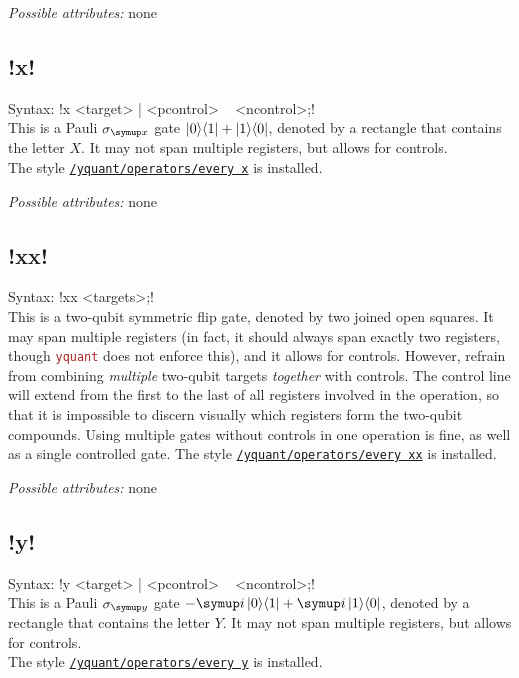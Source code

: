 \documentclass{scrartcl}
\def\pkg#1{\textcolor{brown}{\texttt{#1}}}
\def\style#1{\hyperref[style:#1]{\texttt{#1}}}
\def\Yquant{\pkg{yquant}}
\def\ii{{\symup i}}
\def\ketbra#1#2{\ket{#1}\!\bra{#2}}
\begin{document}
         \emph{Possible attributes:} none
      
      \subsection{\texorpdfstring{\yquant!x!}{x}}\label{gate:x}
         Syntax: \yquant!x <target> | <pcontrol> ~ <ncontrol>;! \\
         This is a Pauli $\sigma_{\symup x}$ gate $\ketbra01 + \ketbra10$, denoted by a rectangle that contains the letter $X$.
         It may not span multiple registers, but allows for controls. \\
         The style \style{/yquant/operators/every x} is installed.
         
         \emph{Possible attributes:} none
         
      \subsection{\texorpdfstring{\yquant!xx!}{xx}}\label{gate:xx}
         Syntax: \yquant!xx <targets>;! \\
         This is a two\hyp qubit symmetric flip gate, denoted by two joined open squares.
         It may span multiple registers (in fact, it should always span exactly two registers, though \Yquant{} does not enforce this), and it allows for controls.
         However, refrain from combining \emph{multiple} two\hyp qubit targets \emph{together} with controls.
         The control line will extend from the first to the last of all registers involved in the operation, so that it is impossible to discern visually which registers form the two\hyp qubit compounds.
         Using multiple gates without controls in one operation is fine, as well as a single controlled gate.
         The style \style{/yquant/operators/every xx} is installed.
         
         \emph{Possible attributes:} none
      
      \subsection{\texorpdfstring{\yquant!y!}{y}}\label{gate:y}
         Syntax: \yquant!y <target> | <pcontrol> ~ <ncontrol>;! \\
         This is a Pauli $\sigma_{\symup y}$ gate $-\ii\ketbra01 + \ii\ketbra10$, denoted by a rectangle that contains the letter $Y$.
         It may not span multiple registers, but allows for controls. \\
         The style \style{/yquant/operators/every y} is installed.
         
\end{document}
